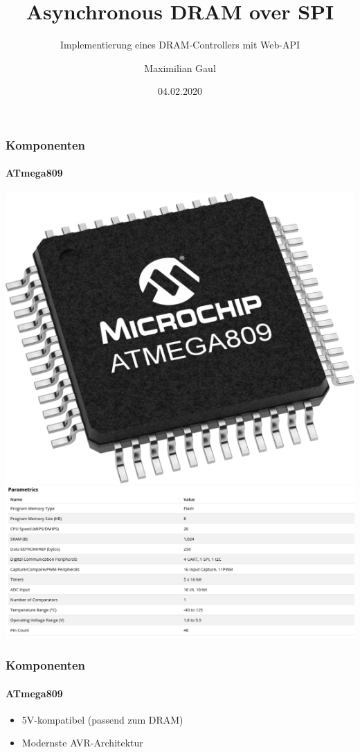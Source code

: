 \documentclass{beamer}
\title{Asynchronous DRAM over SPI}
\subtitle{Implementierung eines DRAM-Controllers mit Web-API}
\author{Maximilian Gaul}
\date{04.02.2020}
\begin{document}
	
\begin{frame}
	\titlepage
\end{frame}

\begin{frame}

	\frametitle{Komponenten}
	\framesubtitle{ATmega809}
	\begin{center}
		\includegraphics[scale=0.1125]{images/ATmega809.png}
		\includegraphics[scale=0.325]{images/ATMEGA809_peripherals.png}
	\end{center}

\end{frame}

\begin{frame}

	\frametitle{Komponenten}
	\framesubtitle{ATmega809}
	\begin{itemize}
		\item 5V-kompatibel (passend zum DRAM)
		\item Modernste AVR-Architektur
	\end{itemize}

\end{frame}
\end{document}
